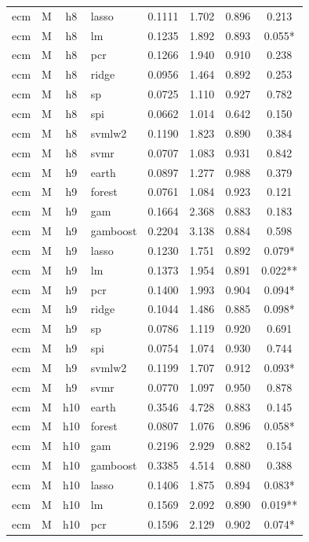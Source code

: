 \begin{ThreePartTable}
\begin{longtable}[t]{llclcccc}
ecm & M & h8 & lasso & 0.1111 & 1.702 & 0.896 & 0.213\\
ecm & M & h8 & lm & 0.1235 & 1.892 & 0.893 & 0.055*\\
ecm & M & h8 & pcr & 0.1266 & 1.940 & 0.910 & 0.238\\
ecm & M & h8 & ridge & 0.0956 & 1.464 & 0.892 & 0.253\\
ecm & M & h8 & sp & 0.0725 & 1.110 & 0.927 & 0.782\\
ecm & M & h8 & spi & 0.0662 & 1.014 & 0.642 & 0.150\\
ecm & M & h8 & svmlw2 & 0.1190 & 1.823 & 0.890 & 0.384\\
ecm & M & h8 & svmr & 0.0707 & 1.083 & 0.931 & 0.842\\
\addlinespace
ecm & M & h9 & earth & 0.0897 & 1.277 & 0.988 & 0.379\\
ecm & M & h9 & forest & 0.0761 & 1.084 & 0.923 & 0.121\\
ecm & M & h9 & gam & 0.1664 & 2.368 & 0.883 & 0.183\\
ecm & M & h9 & gamboost & 0.2204 & 3.138 & 0.884 & 0.598\\
ecm & M & h9 & lasso & 0.1230 & 1.751 & 0.892 & 0.079*\\
ecm & M & h9 & lm & 0.1373 & 1.954 & 0.891 & 0.022**\\
ecm & M & h9 & pcr & 0.1400 & 1.993 & 0.904 & 0.094*\\
ecm & M & h9 & ridge & 0.1044 & 1.486 & 0.885 & 0.098*\\
ecm & M & h9 & sp & 0.0786 & 1.119 & 0.920 & 0.691\\
ecm & M & h9 & spi & 0.0754 & 1.074 & 0.930 & 0.744\\
ecm & M & h9 & svmlw2 & 0.1199 & 1.707 & 0.912 & 0.093*\\
ecm & M & h9 & svmr & 0.0770 & 1.097 & 0.950 & 0.878\\
\addlinespace
ecm & M & h10 & earth & 0.3546 & 4.728 & 0.883 & 0.145\\
ecm & M & h10 & forest & 0.0807 & 1.076 & 0.896 & 0.058*\\
ecm & M & h10 & gam & 0.2196 & 2.929 & 0.882 & 0.154\\
ecm & M & h10 & gamboost & 0.3385 & 4.514 & 0.880 & 0.388\\
ecm & M & h10 & lasso & 0.1406 & 1.875 & 0.894 & 0.083*\\
ecm & M & h10 & lm & 0.1569 & 2.092 & 0.890 & 0.019**\\
ecm & M & h10 & pcr & 0.1596 & 2.129 & 0.902 & 0.074*\\

\end{longtable}
\end{ThreePartTable}

